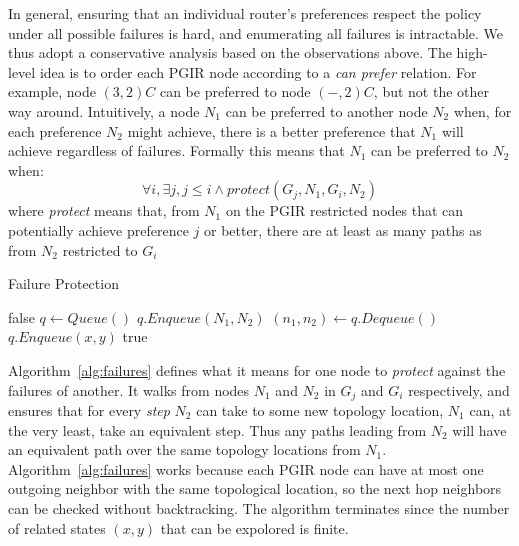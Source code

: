 In general, ensuring that an individual router's preferences respect the policy under all possible failures is hard, and enumerating all failures is intractable. We thus adopt a conservative analysis based on the observations above. The high-level idea is to order each PGIR node according to a \textit{can prefer} relation. For example, node $(3,2) C$ can be preferred to node $(-,2) C$, but not the other way around. Intuitively, a node $N_1$ can be preferred to another node $N_2$ when, for each preference $N_2$ might achieve, there is a better preference that $N_1$ will achieve regardless of failures. Formally this means that $N_1$ can be preferred to $N_2$ when:
%
$$\forall i, \exists j, j \leq i \wedge protect(G_j, N_1, G_i, N_2)$$
%
where \textit{protect} means that, from $N_1$ on the PGIR restricted nodes that can potentially achieve preference $j$ or better, there are at least as many paths as from $N_2$ restricted to $G_i$

\begin{algorithm}[t!]
\caption{Failure Protection}
\label{alg:failures}
\begin{algorithmic}[1]
   \Return false
  \EndIf
  \State $q \gets Queue()$
  \State $q.Enqueue (N_1, N_2)$
    \State $(n_1,n_2) \gets q.Dequeue()$
          \State $q.Enqueue(x,y)$
        \EndIf
      \EndIf
    \EndFor
  \EndWhile
  \Return true
  \EndProcedure
\end{algorithmic}
\end{algorithm}

Algorithm~\ref{alg:failures} defines what it means for one node to \textit{protect} against the failures of another. It walks from nodes $N_1$ and $N_2$ in $G_j$ and $G_i$ respectively, and ensures that for every \textit{step} $N_2$ can take to some new topology location, $N_1$ can, at the very least, take an equivalent step. Thus any paths leading from $N_2$ will have an equivalent path over the same topology locations from $N_1$. Algorithm~\ref{alg:failures} works because each PGIR node can have at most one outgoing neighbor with the same topological location, so the next hop neighbors can be checked without backtracking. The algorithm terminates since the number of related states $(x,y)$ that can be expolored is finite.

